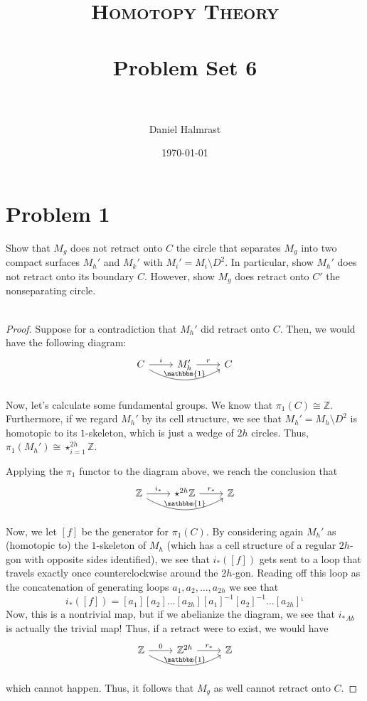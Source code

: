\documentclass[fontsize=11pt]{scrartcl} %
\title{	
\normalfont \normalsize 
\textsc{Homotopy Theory} \\ [25pt] %
\horrule{0.5pt} \\[0.4cm] %
\huge Problem Set 6 \\ %
\horrule{2pt} \\[0.5cm] %
}
\author{Daniel Halmrast} %
\date{\normalsize\today} %
\numberwithin{equation}{section} %
\numberwithin{figure}{section} %
\numberwithin{table}{section} %
\newcommand{\Z}{\mathbb{Z}}
\begin{document}
\maketitle %

\section*{Problem 1}
Show that $M_g$ does not retract onto $C$ the circle that separates $M_g$ into
two compact surfaces $M_h'$ and $M_k'$ with $M_i'=M_i\setminus D^2$. In
particular, show $M_h'$ does not retract onto its boundary $C$. However, show
$M_g$ does retract onto $C'$ the nonseparating circle.
\\
\\
\begin{proof}
    Suppose for a contradiction that $M_h'$ did retract onto $C$. Then, we would
    have the following diagram:
    \[
\begin{tikzcd}
    C\arrow{r}{i}\arrow[bend right]{rr}{\mathbbm{1}} &M_h'\arrow{r}{r} &C\\
\end{tikzcd}
    \]
    Now, let's calculate some fundamental groups. We know that $\pi_1(C) \cong
    \Z$. Furthermore, if we regard $M_h'$ by its cell structure, we see that
    $M_h' = M_h\setminus D^2$ is homotopic to its $1$-skeleton, which is just a
    wedge of $2h$ circles. Thus, $\pi_1(M_h')\cong \star_{i=1}^{2h}\Z$.

    Applying the $\pi_1$ functor to the diagram above, we reach the conclusion
    that
    \[
\begin{tikzcd}
    \Z\arrow{r}{i_*}\arrow[bend right]{rr}{\mathbbm{1}}
    &\star^{2h}\Z\arrow{r}{r_*} &\Z\\
\end{tikzcd}
    \]
    Now, we let $[f]$ be the generator for $\pi_1(C)$. By considering again
    $M_h'$ as (homotopic to) the $1$-skeleton of $M_h$ (which has a cell
    structure of a regular $2h$-gon with opposite sides identified), we see that
    $i_*([f])$ gets sent to a loop that travels exactly once counterclockwise
    around the $2h$-gon. Reading off this loop as the concatenation of
    generating loops $a_1,a_2,\dots,a_{2h}$ we see that
    \[
        i_*([f]) = [a_1][a_2]\dots[a_{2h}][a_1]^{-1}[a_2]^{-1}\dots[a_{2h}]^{_1}
    \]
    Now, this is a nontrivial map, but if we abelianize the diagram, we see that
    $i_*{}_{Ab}$ is actually the trivial map! Thus, if a retract were to exist,
    we would have
    \[
\begin{tikzcd}
    \Z\arrow{r}{0}\arrow[bend right]{rr}{\mathbbm{1}}
    &\Z^{2h}\arrow{r}{r_*} &\Z\\
\end{tikzcd}
    \]
    which cannot happen. Thus, it follows that $M_g$ as well cannot retract onto
    $C$.


\end{proof}
\end{document}
